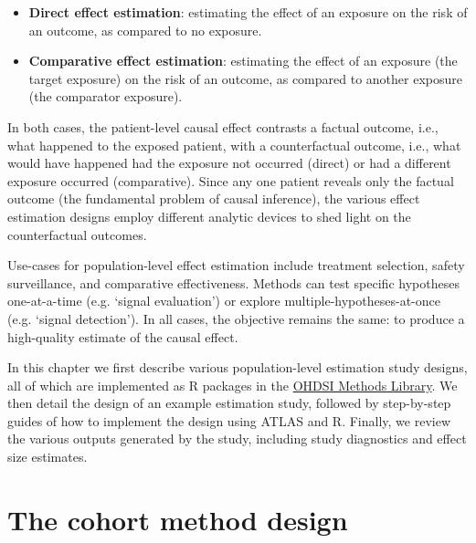 \documentclass[11pt]{book}
\providecommand{\tightlist}{%
  \setlength{\itemsep}{0pt}\setlength{\parskip}{0pt}}
\begin{document}
\begin{itemize}
\tightlist
\item
  \textbf{Direct effect estimation}: estimating the effect of an
  exposure on the risk of an outcome, as compared to no exposure.
\item
  \textbf{Comparative effect estimation}: estimating the effect of an
  exposure (the target exposure) on the risk of an outcome, as compared
  to another exposure (the comparator exposure).
\end{itemize}

In both cases, the patient-level causal effect contrasts a factual
outcome, i.e., what happened to the exposed patient, with a
counterfactual outcome, i.e., what would have happened had the exposure
not occurred (direct) or had a different exposure occurred
(comparative). Since any one patient reveals only the factual outcome
(the fundamental problem of causal inference), the various effect
estimation designs employ different analytic devices to shed light on
the counterfactual outcomes.

Use-cases for population-level effect estimation include treatment
selection, safety surveillance, and comparative effectiveness. Methods
can test specific hypotheses one-at-a-time (e.g. `signal evaluation') or
explore multiple-hypotheses-at-once (e.g. `signal detection'). In all
cases, the objective remains the same: to produce a high-quality
estimate of the causal effect.

In this chapter we first describe various population-level estimation
study designs, all of which are implemented as R packages in the
\href{https://ohdsi.github.io/MethodsLibrary/}{OHDSI Methods Library}.
We then detail the design of an example estimation study, followed by
step-by-step guides of how to implement the design using ATLAS and R.
Finally, we review the various outputs generated by the study, including
study diagnostics and effect size estimates.

\section{The cohort method design}\label{CohortMethod}
\end{document}

